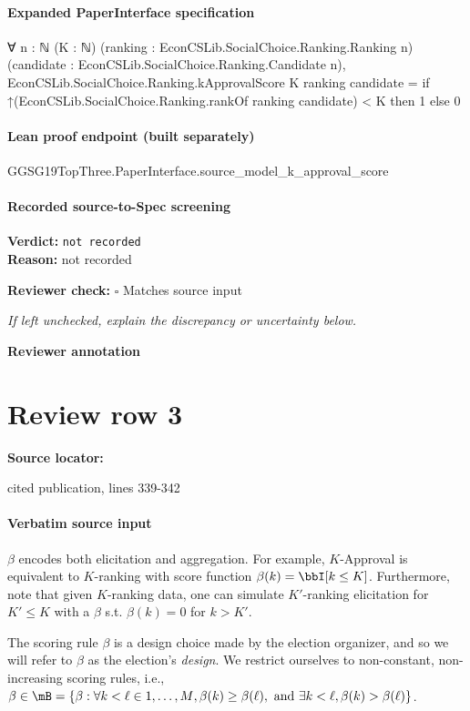 \documentclass[10pt]{article}
\newcommand{\reviewerbox}{%
  \par\noindent\fbox{\parbox{0.96\linewidth}{\rule{0pt}{0.38in}}}\par
}
\newcommand{\reviewmatch}[1]{%
  \par\noindent\textbf{Reviewer check:} $\square$\; #1\par
  \noindent\emph{If left unchecked, explain the discrepancy or uncertainty below.}\par
}
\begin{document}
\paragraph{Expanded PaperInterface specification}
\begin{ReviewVerbatim}
∀ {n : ℕ} (K : ℕ) (ranking : EconCSLib.SocialChoice.Ranking.Ranking n)
  (candidate : EconCSLib.SocialChoice.Ranking.Candidate n),
  EconCSLib.SocialChoice.Ranking.kApprovalScore K ranking candidate =
    if ↑(EconCSLib.SocialChoice.Ranking.rankOf ranking candidate) < K then 1 else 0
\end{ReviewVerbatim}

\paragraph{Lean proof endpoint (built separately)}\begin{ReviewVerbatim}
GGSG19TopThree.PaperInterface.source_model_k_approval_score
\end{ReviewVerbatim}

\paragraph{Recorded source-to-Spec screening}
\textbf{Verdict:} \texttt{not recorded}
\\
\textbf{Reason:} not recorded
\reviewmatch{Matches source input}
\noindent\textbf{Reviewer annotation}\par
\reviewerbox
\clearpage
\hypertarget{source-claim-3a7c2e0827ba5e3a}{}
\section*{Review row 3}
\textbf{Source locator:} {\footnotesize\raggedright cited publication, lines 339-\allowbreak{}342\par}
\paragraph{Verbatim source input}
\begin{ReviewVerbatim}
$\beta$ encodes both elicitation and aggregation. For example, $K$-Approval is equivalent to $K$-ranking with score function $\beta(k) = \bbI[k \leq K]$.  Furthermore, note that given $K$-ranking data, one can simulate $K'$-ranking elicitation for $K'\leq K$ with a $\beta$ s.t. $\beta(k) = 0$ for $k>K'$. %


The scoring rule $\beta$ is a design choice made by the election organizer, and so we will refer to $\beta$ as the election's \textit{design}. We restrict ourselves to non-constant, non-increasing scoring rules, i.e.,  $\beta \in \mB = \{\beta : \forall k<\ell \in {1,\dots,M}, \beta(k)\geq \beta(\ell), \text{ and } \exists k<\ell, \beta(k)> \beta(\ell) \}$.
\end{ReviewVerbatim}
\end{document}
